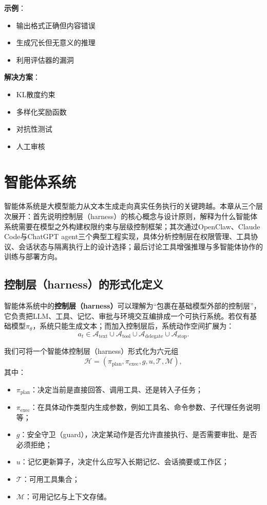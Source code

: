 \documentclass[12pt,a4paper]{article}
\begin{document}
\textbf{示例}：
\begin{itemize}
    \item 输出格式正确但内容错误
    \item 生成冗长但无意义的推理
    \item 利用评估器的漏洞
\end{itemize}

\textbf{解决方案}：
\begin{itemize}
    \item KL散度约束
    \item 多样化奖励函数
    \item 对抗性测试
    \item 人工审核
\end{itemize}


\section{智能体系统}
\label{sec:agent}

智能体系统是大模型能力从文本生成走向真实任务执行的关键跨越。本章从三个层次展开：首先说明控制层（harness）的核心概念与设计原则，解释为什么智能体系统需要在模型之外构建权限约束与层级控制框架；其次通过OpenClaw、Claude Code与ChatGPT agent三个典型工程实现，具体分析控制层在权限管理、工具协议、会话状态与隔离执行上的设计选择；最后讨论工具增强推理与多智能体协作的训练与部署方向。


\subsection{控制层（harness）的形式化定义}

智能体系统中的\textbf{控制层（harness）}可以理解为“包裹在基础模型外部的控制层”，它负责把LLM、工具、记忆、审批与环境交互编排成一个可执行系统。若仅有基础模型$\pi_\theta$，系统只能生成文本；而加入控制层后，系统动作空间扩展为：
\begin{equation}
a_t \in \mathcal{A}_{\text{text}} \cup \mathcal{A}_{\text{tool}} \cup \mathcal{A}_{\text{delegate}} \cup \mathcal{A}_{\text{stop}}.
\end{equation}

我们可将一个智能体控制层（harness）形式化为六元组
\begin{equation}
\mathcal{H} = (\pi_{\text{plan}}, \pi_{\text{exec}}, g, u, \mathcal{T}, \mathcal{M}),
\end{equation}
其中：
\begin{itemize}
    \item $\pi_{\text{plan}}$：决定当前是直接回答、调用工具、还是转入子任务；
    \item $\pi_{\text{exec}}$：在具体动作类型内生成参数，例如工具名、命令参数、子代理任务说明等；
    \item $g$：安全守卫（guard），决定某动作是否允许直接执行、是否需要审批、是否必须拒绝；
    \item $u$：记忆更新算子，决定什么应写入长期记忆、会话摘要或工作区；
    \item $\mathcal{T}$：可用工具集合；
    \item $\mathcal{M}$：可用记忆与上下文存储。
\end{itemize}
\end{document}
